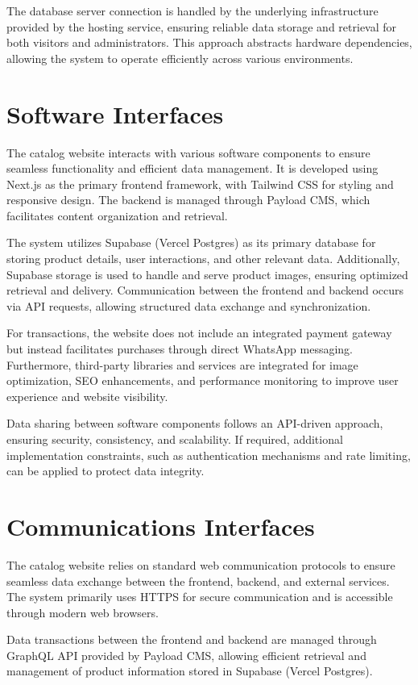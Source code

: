 \documentclass[oneside,a4paper,12pt,explicit]{book}
\begin{document}
The database server connection is handled by the underlying infrastructure provided by the hosting service, ensuring reliable data storage and retrieval for both visitors and administrators. This approach abstracts hardware dependencies, allowing the system to operate efficiently across various environments.

\section{Software Interfaces}
The catalog website interacts with various software components to ensure seamless functionality and efficient data management. It is developed using Next.js as the primary frontend framework, with Tailwind CSS for styling and responsive design. The backend is managed through Payload CMS, which facilitates content organization and retrieval.

The system utilizes Supabase (Vercel Postgres) as its primary database for storing product details, user interactions, and other relevant data. Additionally, Supabase storage is used to handle and serve product images, ensuring optimized retrieval and delivery. Communication between the frontend and backend occurs via API requests, allowing structured data exchange and synchronization.

For transactions, the website does not include an integrated payment gateway but instead facilitates purchases through direct WhatsApp messaging. Furthermore, third-party libraries and services are integrated for image optimization, SEO enhancements, and performance monitoring to improve user experience and website visibility.

Data sharing between software components follows an API-driven approach, ensuring security, consistency, and scalability. If required, additional implementation constraints, such as authentication mechanisms and rate limiting, can be applied to protect data integrity.

\section{Communications Interfaces}
The catalog website relies on standard web communication protocols to ensure seamless data exchange between the frontend, backend, and external services. The system primarily uses HTTPS for secure communication and is accessible through modern web browsers.

Data transactions between the frontend and backend are managed through GraphQL API provided by Payload CMS, allowing efficient retrieval and management of product information stored in Supabase (Vercel Postgres).
\end{document}
